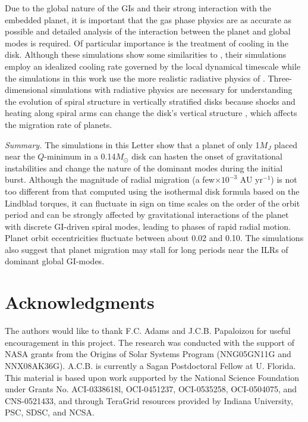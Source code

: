\documentclass[12pt,manuscript,authoryear]{aastex}
\begin{document}
Due to the global nature of the GIs and their strong interaction with the embedded planet, it is important that the gas
phase physics are as accurate as possible and detailed analysis of the interaction between the planet and global modes
is required. Of particular importance is the treatment of cooling in the disk. Although these simulations show some
similarities to \citet{baruteau2011}, their simulations employ an idealized cooling rate governed by the local dynamical
timescale while the simulations in this work use the more realistic radiative physics of
\citet{boley2007b}. Three-dimensional simulations with radiative physics are necessary for understanding the evolution
of spiral structure in vertically stratified disks because shocks and heating along spiral arms can change the disk's
vertical structure \citep[e.g.][]{boley2006a}, which affects the migration rate of planets.

{\it Summary.} The simulations in this Letter show that a planet of only 1$M_J$ placed near the $Q$-minimum in a
0.14$M_{\odot}$ disk can hasten the onset of gravitational instabilities and change the nature of the dominant modes
during the initial burst. Although the magnitude of radial migration (a few$\times10^{-3}$ AU yr$^{-1}$) is not too
different from that computed using the \citet{tanaka2002} isothermal disk formula based on the Lindblad torques, it can
fluctuate in sign on time scales on the order of the orbit period and can be strongly affected by gravitational
interactions of the planet with discrete GI-driven spiral modes, leading to phases of rapid radial motion. Planet orbit
eccentricities fluctuate between about 0.02 and 0.10. The simulations also suggest that planet migration may stall for
long periods near the ILRs of dominant global GI-modes.

\section{Acknowledgments}

The authors would like to thank F.C. Adams and J.C.B. Papaloizou for useful encouragement in this project. The research
was conducted with the support of NASA grants from the Origins of Solar Systems Program (NNG05GN11G and
NNX08AK36G). A.C.B. is currently a Sagan Postdoctoral Fellow at U. Florida. This material is based upon work supported
by the National Science Foundation under Grants No. ACI-0338618l, OCI-0451237, OCI-0535258, OCI-0504075, and
CNS-0521433, and through TeraGrid resources provided by Indiana University, PSC, SDSC, and NCSA.
\end{document}
